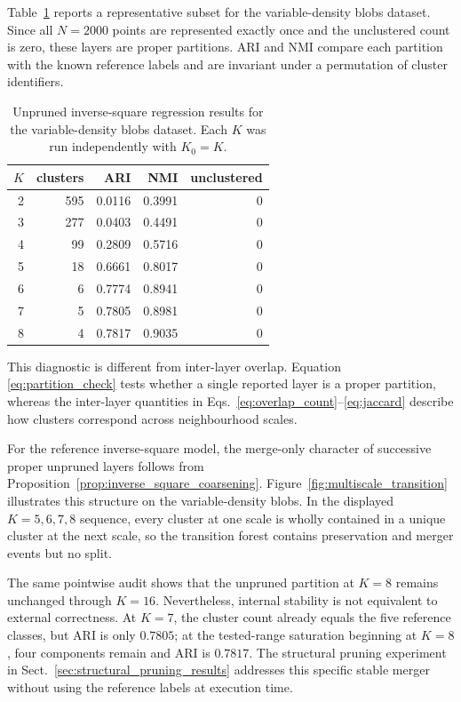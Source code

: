 \documentclass[review,12pt]{elsarticle}
\begin{document}
Table~\ref{tab:partition_diagnostic} reports a representative subset for the variable-density blobs dataset. Since all $N=2000$ points are represented exactly once and the unclustered count is zero, these layers are proper partitions. ARI and NMI compare each partition with the known reference labels and are invariant under a permutation of cluster identifiers.

\begin{table}[t]
\caption{Unpruned inverse-square regression results for the variable-density blobs dataset. Each $K$ was run independently with $K_0=K$.}\label{tab:partition_diagnostic}
\centering
\begin{tabular}{rrrrr}
\toprule
$K$ & clusters & ARI & NMI & unclustered\\
\midrule
2 & 595 & 0.0116 & 0.3991 & 0\\
3 & 277 & 0.0403 & 0.4491 & 0\\
4 & 99  & 0.2809 & 0.5716 & 0\\
5 & 18  & 0.6661 & 0.8017 & 0\\
6 & 6   & 0.7774 & 0.8941 & 0\\
7 & 5   & 0.7805 & 0.8981 & 0\\
8 & 4   & 0.7817 & 0.9035 & 0\\
\bottomrule
\end{tabular}
\end{table}

This diagnostic is different from inter-layer overlap. Equation~
\eqref{eq:partition_check} tests whether a single reported layer is a proper
partition, whereas the inter-layer quantities in
Eqs.~\eqref{eq:overlap_count}--\eqref{eq:jaccard} describe how clusters
correspond across neighbourhood scales.

For the reference inverse-square model, the merge-only character of
successive proper unpruned layers follows from
Proposition~\ref{prop:inverse_square_coarsening}.
Figure~\ref{fig:multiscale_transition} illustrates this structure on the
variable-density blobs. In the displayed $K=5,6,7,8$ sequence, every cluster
at one scale is wholly contained in a unique cluster at the next scale, so
the transition forest contains preservation and merger events but no split.

The same pointwise audit shows that the unpruned partition at $K=8$ remains
unchanged through $K=16$. Nevertheless, internal stability is not equivalent
to external correctness. At $K=7$, the cluster count already equals the five
reference classes, but ARI is only $0.7805$; at the tested-range saturation
beginning at $K=8$, four components remain and ARI is $0.7817$. The structural
pruning experiment in Sect.~\ref{sec:structural_pruning_results} addresses
this specific stable merger without using the reference labels at execution
time.
\end{document}
